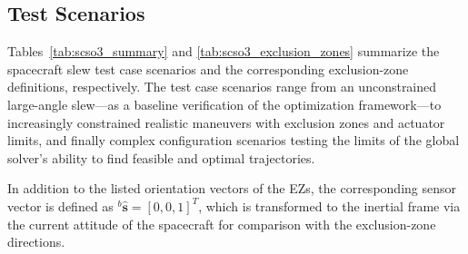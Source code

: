 \subsection{Test Scenarios}

Tables~\ref{tab:scso3_summary} and \ref{tab:scso3_exclusion_zones} summarize the spacecraft slew test case scenarios and the corresponding exclusion-zone definitions, respectively.
The test case scenarios range from an unconstrained large-angle slew---as a baseline verification of the optimization framework---to increasingly constrained realistic maneuvers with exclusion zones and actuator limits, and finally complex configuration scenarios testing the limits of the global solver's ability to find feasible and optimal trajectories. 

In addition to the listed orientation vectors of the \ac{EZ}s, the corresponding sensor vector is defined as ${}^b\mathbf{\hat{s}} = \left[0, 0, 1\right]^{T}$, which is transformed to the inertial frame via the current attitude of the spacecraft for comparison with the exclusion-zone directions.

\newcommand{\quat}[4]{\begin{gathered}\text{[}#1,\ #2,\\[-1pt]#3,\ #4\text{]}^{T}\end{gathered}}
\newcommand{\ezvec}[3]{\left[#1,\ #2,\ #3\right]^{T}}


